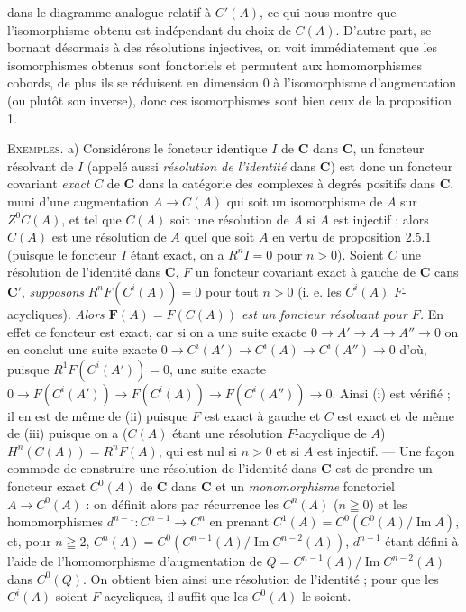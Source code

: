 
\noindent dans le diagramme analogue relatif à $C'(A)$, ce qui nous montre
que l'isomorphisme obtenu est indépendant du choix de $C(A)$. D'autre part,
se bornant désormais à des résolutions injectives, on voit immédiatement que
les isomorphismes obtenus sont fonctoriels et permutent aux homomorphismes
cobords, de plus ils se réduisent en dimension 0 à l'isomorphisme
d'augmentation (ou plutôt son inverse), donc ces isomorphismes sont bien ceux
de la proposition 1.

\textsc{Exemples.} a) Considérons le foncteur identique $I$ de $\mathbf{C}$
dans $\mathbf{C}$, un foncteur résolvant de $I$ (appelé aussi \textit{résolution de
l'identité} dans $\mathbf{C}$) est donc un foncteur covariant \textit{exact} $C$ de $\mathbf{C}$
dans la catégorie des complexes à degrés positifs dans $\mathbf{C}$, muni d'une
augmentation $A\to C(A)$ qui soit un isomorphisme de $A$ sur
$Z^0C(A)$, et tel que $C(A)$ soit une résolution de $A$ si $A$ est injectif ;
alors $C(A)$ est une résolution de $A$ quel que soit $A$ en vertu de
proposition 2.5.1 (puisque le foncteur $I$ étant exact, on a $R^nI=0$ pour
$n>0$). Soient $C$ une résolution de l'identité dans $\mathbf{C}$, $F$ un
foncteur covariant exact à gauche de $\mathbf{C}$ cans $\mathbf{C}'$, \textit{supposons}
$R^nF(C^i(A))=0$ pour tout $n>0$ (i. e. les $C^i(A)$ $F$-acycliques).
\textit{Alors $\mathbf F(A)=F(C(A))$ est un foncteur résolvant pour $F$.} En
effet ce foncteur est exact, car si on a une suite exacte
$0\to A'\to A\to A''\to0$
on en conclut une suite exacte
$0\to C^i(A')\to C^i(A)\to
C^i(A'')\to0$ d'où, puisque $R^1F(C^i(A'))=0$, une suite exacte
$0\to F(C^i(A'))\to F(C^i(A))
\to F(C^i(A''))\to0$.
Ainsi (i) est vérifié ; il en est de même de (ii) puisque $F$ est exact à
gauche et $C$ est exact et de même de (iii) puisque on a ($C(A)$
étant une résolution $F$-acyclique de $A$)
$H^n(C(A))=R^nF(A)$, qui est nul si $n>0$ et si $A$ est injectif. --- Une façon
commode de construire une résolution de l'identité dans $\mathbf{C}$ est de prendre un
foncteur exact $C^0(A)$ de $\mathbf{C}$ dans $\mathbf{C}$ et un \textit{monomorphisme} fonctoriel
$A\to C^0(A)$ : on définit alors par récurrence les $C^n(A)$
($n\geqq0$) et les homomorphismes $d^{n-1}:C^{n-1}\to C^n$ en
prenant
$C^1(A)=C^0(C^0(A)/\operatorname{Im}A)$,
et, pour $n\geqq2$,
$C^n(A)=C^0(C^{n-1}(A)/\operatorname{Im}C^{n-2}(A))$,
$d^{n-1}$ étant défini à l'aide de l'homomorphisme d'augmentation de
$Q=C^{n-1}(A)/\operatorname{Im}C^{n-2}(A)$ dans $C^0(Q)$. On obtient bien
ainsi une résolution de l'identité ; pour que les $C^i(A)$ soient
$F$-acycliques, il suffit que les $C^0(A)$ le soient.

